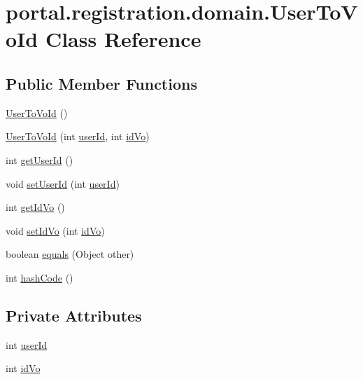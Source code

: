 \hypertarget{classportal_1_1registration_1_1domain_1_1UserToVoId}{
\section{portal.registration.domain.UserToVoId Class Reference}
\label{classportal_1_1registration_1_1domain_1_1UserToVoId}
}
\subsection*{Public Member Functions}
\begin{DoxyCompactItemize}
\item 
\hyperlink{classportal_1_1registration_1_1domain_1_1UserToVoId_a452af520e7af1577fe8fb6164d727d22}{UserToVoId} ()
\item 
\hyperlink{classportal_1_1registration_1_1domain_1_1UserToVoId_ae8eec79901e1d3a2b92ef055a1862c72}{UserToVoId} (int \hyperlink{classportal_1_1registration_1_1domain_1_1UserToVoId_ac0722add7861114db7fcf5242a1a8211}{userId}, int \hyperlink{classportal_1_1registration_1_1domain_1_1UserToVoId_ac0376a39a3931654327d2723ad3fcc02}{idVo})
\item 
int \hyperlink{classportal_1_1registration_1_1domain_1_1UserToVoId_a51dd9683dd7d36a4eeb56d371240abc0}{getUserId} ()
\item 
void \hyperlink{classportal_1_1registration_1_1domain_1_1UserToVoId_a1d0a4d8a90c71496ca43144b17b67bdb}{setUserId} (int \hyperlink{classportal_1_1registration_1_1domain_1_1UserToVoId_ac0722add7861114db7fcf5242a1a8211}{userId})
\item 
int \hyperlink{classportal_1_1registration_1_1domain_1_1UserToVoId_aab29eec54ed0e9eb7b00e57fd7778b91}{getIdVo} ()
\item 
void \hyperlink{classportal_1_1registration_1_1domain_1_1UserToVoId_ad5d98f521d69a14de68991c6d41fd37e}{setIdVo} (int \hyperlink{classportal_1_1registration_1_1domain_1_1UserToVoId_ac0376a39a3931654327d2723ad3fcc02}{idVo})
\item 
boolean \hyperlink{classportal_1_1registration_1_1domain_1_1UserToVoId_a2f2501bdc104cd6569eb17c7cd7d8d3c}{equals} (Object other)
\item 
int \hyperlink{classportal_1_1registration_1_1domain_1_1UserToVoId_a21004305ac3050a35fdcfdfcbe54ca6c}{hashCode} ()
\end{DoxyCompactItemize}
\subsection*{Private Attributes}
\begin{DoxyCompactItemize}
\item 
int \hyperlink{classportal_1_1registration_1_1domain_1_1UserToVoId_ac0722add7861114db7fcf5242a1a8211}{userId}
\item 
int \hyperlink{classportal_1_1registration_1_1domain_1_1UserToVoId_ac0376a39a3931654327d2723ad3fcc02}{idVo}
\end{DoxyCompactItemize}
